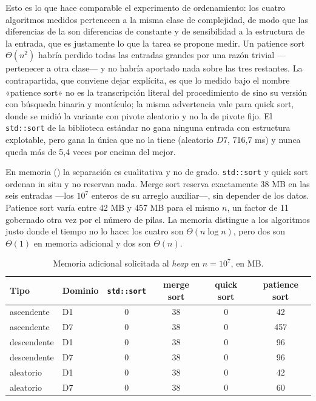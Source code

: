 Esto es lo que hace comparable el experimento de ordenamiento: los cuatro
algoritmos medidos pertenecen a la misma clase de complejidad, de modo que las
diferencias de la  son diferencias de constante y de
sensibilidad a la estructura de la entrada, que es justamente lo que la tarea se
propone medir. Un patience sort $\Theta(n^2)$ habría perdido todas las entradas
grandes por una razón trivial ---pertenecer a otra clase--- y no habría aportado
nada sobre las tres restantes. La contrapartida, que conviene dejar explícita, es
que lo medido bajo el nombre «patience sort» no es la transcripción literal del
procedimiento de \textcite{mallows1963} sino su versión con búsqueda binaria y
montículo; la misma advertencia vale para quick sort, donde se midió la variante
con pivote aleatorio y no la de pivote fijo. El
\texttt{std::sort} de la biblioteca estándar no gana ninguna entrada con
estructura explotable, pero gana la única que no la tiene (aleatorio $D7$,
716,7 ms) y nunca queda más de 5,4 veces por encima del mejor.

En memoria () la separación es cualitativa y no de grado.
\texttt{std::sort} y quick sort ordenan in situ y no reservan nada. Merge sort
reserva exactamente 38 MB en las seis entradas ---los $10^7$ enteros de su
arreglo auxiliar---, sin depender de los datos. Patience sort varía entre 42 MB y
457 MB para el mismo $n$, un factor de 11 gobernado otra vez por el número de
pilas. La memoria distingue a los algoritmos justo donde el tiempo no lo hace:
los cuatro son $\Theta(n \log n)$, pero dos son $\Theta(1)$ en memoria adicional
y dos son $\Theta(n)$.

\begin{table}[ht]
  \centering
  \begin{tabular}{llcccc}
  \hline
  Tipo & Dominio & \texttt{std::sort} & merge sort & quick sort & patience sort \\
  \hline
  ascendente  & D1 & 0 & 38 & 0 &  42 \\
  ascendente  & D7 & 0 & 38 & 0 & 457 \\
  descendente & D1 & 0 & 38 & 0 &  96 \\
  descendente & D7 & 0 & 38 & 0 &  96 \\
  aleatorio   & D1 & 0 & 38 & 0 &  42 \\
  aleatorio   & D7 & 0 & 38 & 0 &  60 \\
  \hline
  \end{tabular}
  \caption{Memoria adicional solicitada al \emph{heap} en $n = 10^7$, en MB.}
  \label{tab:orden-memoria}
\end{table}

